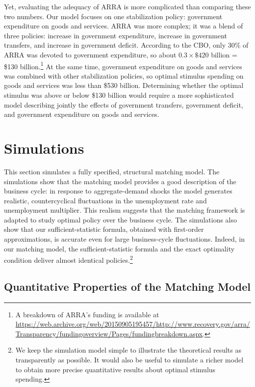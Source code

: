 \documentclass[letterpaper,12pt,leqno]{article}
\begin{document}
\begin{bibunit}
Yet, evaluating the adequacy of ARRA is more complicated than comparing these two numbers. Our model focuses on one stabilization policy: government expenditure on goods and services. ARRA was more complex; it was a blend of three policies: increase in government expenditure, increase in government transfers, and increase in government deficit. According to the CBO, only 30\% of ARRA was devoted to government expenditure, so about $0.3 \times \$420$ billion = \$130 billion.\footnote{A breakdown of ARRA's funding is available at \url{https://web.archive.org/web/20150905195457/http://www.recovery.gov/arra/Transparency/fundingoverview/Pages/fundingbreakdown.aspx}.} At the same time, government expenditure on goods and services was combined with other stabilization policies, so optimal stimulus spending on goods and services was less than \$530 billion. Determining whether the optimal stimulus was above or below \$130 billion would require a more sophisticated model describing jointly the effects of government transfers, government deficit, and government expenditure on goods and services.

\section{Simulations}\label{sec:simulation}

This section simulates a fully specified, structural matching model. The simulations show that the matching model provides a good description of the business cycle: in response to aggregate-demand shocks the model generates realistic, countercyclical fluctuations in the unemployment rate and unemployment multiplier. This realism suggests that the matching framework is adapted to study optimal policy over the business cycle. The simulations also show that our sufficient-statistic formula, obtained with first-order approximations, is accurate even for large business-cycle fluctuations. Indeed, in our matching model, the sufficient-statistic formula and the exact optimality condition deliver almost identical policies.\footnote{We keep the simulation model simple to illustrate the theoretical results as transparently as possible. It would also be useful to simulate a richer model to obtain more precise quantitative results about optimal stimulus spending.}

\subsection{Quantitative Properties of the Matching Model}


\end{bibunit}
\end{document}
